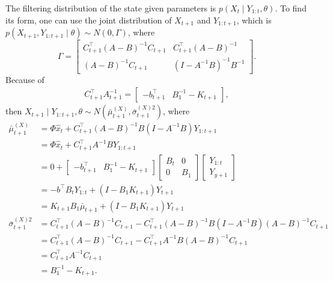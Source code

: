 The filtering distribution of the state given parameters is $p(X_t\mid Y_{1:t}, \theta )$. To find its form, one can use the joint distribution of $X_{t+1}$ and $Y_{1:t+1}$, which is $p(X_{t+1}, Y_{1:t+1}  \mid  \theta)\sim N(0,\Gamma)$, where
\begin{equation*}
\Gamma=\begin{bmatrix} C_{t+1}^\top(A-B)^{-1}C_{t+1} & C_{t+1}^\top(A-B)^{-1}\\(A-B)^{-1}C_{t+1} & (I-A^{-1}B)^{-1}B^{-1} \end{bmatrix}.
\end{equation*}
Because of 
\begin{align*}
C_{t+1}^\top A_{t+1}^{-1} = \left[\begin{matrix} - b_{t+1}^\top & B_1^{-1}- K_{t+1} \end{matrix} \right],
\end{align*}
then $X_{t+1}\mid Y_{1:t+1},\theta \sim N(\bar{\mu}_{t+1}^{(X)},\bar{\sigma}_{t+1}^{(X)2})$, where
\begin{align*}
\bar{\mu}_{t+1}^{(X)}       &= \Phi \hat{x}_{t} +  C_{t+1}^\top (A-B)^{-1}B (I-A^{-1}B)Y_{1:t+1}\\
                      &= \Phi \hat{x}_{t} +  C_{t+1}^\top A^{-1}B Y_{1:t+1} \\ 
                      &=0+ \begin{bmatrix} - b_{t+1}^\top & B_1^{-1}-K_{t+1} \end{bmatrix}\begin{bmatrix} B_t & 0 \\ 0 & B_1 \end{bmatrix} \begin{bmatrix} Y_{1:t} \\ Y_{y+1} \end{bmatrix} \\
                      &=   -b^\top B_t Y_{1:t} + (I - B_1K_{t+1})Y_{t+1} \\
                      & =  K_{t+1}B_1\bar{\mu}_{t+1 } + (I - B_1K_{t+1})Y_{t+1}  \\
\bar{\sigma}_{t+1}^{(X)2}&=C_{t+1}^\top(A-B)^{-1}C_{t+1}-  C_{t+1}^\top(A-B)^{-1}  B(I-A^{-1}B) (A-B)^{-1}C_{t+1}\\
                      &= C_{t+1}^\top(A-B)^{-1}C_{t+1} -  C_{t+1}^\top A^{-1}B(A-B)^{-1}C_{t+1}\\
                      &= C_{t+1}^\top A^{-1}C_{t+1} \\ &=B_1^{-1}-K_{t+1}.
\end{align*}




